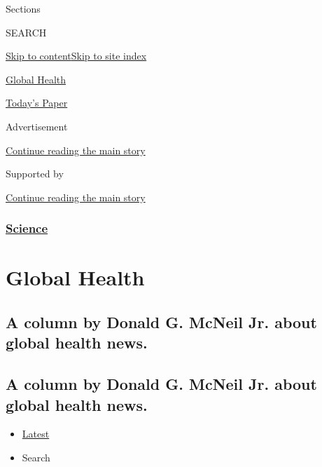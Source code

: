 Sections

SEARCH

\protect\hyperlink{site-content}{Skip to
content}\protect\hyperlink{site-index}{Skip to site index}

\href{https://www.nytimes.com/column/global-health}{Global Health}

\href{https://myaccount.nytimes.com/auth/login?response_type=cookie\&client_id=vi}{}

\href{https://www.nytimes.com/section/todayspaper}{Today's Paper}

Advertisement

\protect\hyperlink{after-top}{Continue reading the main story}

Supported by

\protect\hyperlink{after-sponsor}{Continue reading the main story}

\hypertarget{science}{%
\subsubsection{\texorpdfstring{\href{/section/science}{Science}}{Science}}\label{science}}

\hypertarget{global-health}{%
\section{Global Health}\label{global-health}}

\hypertarget{a-column-by-donald-g-mcneil-jr-about-global-health-news}{%
\subsection{A column by Donald G. McNeil Jr. about global health
news.}\label{a-column-by-donald-g-mcneil-jr-about-global-health-news}}

\hypertarget{a-column-by-donald-g-mcneil-jr-about-global-health-news-1}{%
\subsection{A column by Donald G. McNeil Jr. about global health
news.}\label{a-column-by-donald-g-mcneil-jr-about-global-health-news-1}}

\begin{itemize}
\tightlist
\item
  \protect\hyperlink{stream-panel}{Latest}
\item
  Search
\end{itemize}

